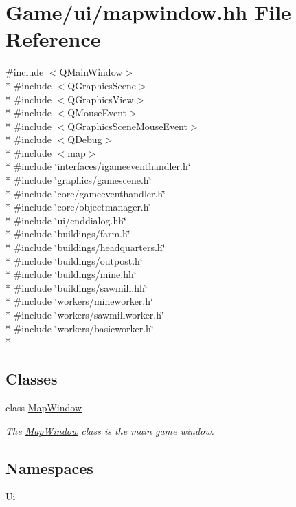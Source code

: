 \hypertarget{mapwindow_8hh}{\section{Game/ui/mapwindow.hh File Reference}
\label{mapwindow_8hh}
}
{\ttfamily \#include $<$Q\-Main\-Window$>$}\\*
{\ttfamily \#include $<$Q\-Graphics\-Scene$>$}\\*
{\ttfamily \#include $<$Q\-Graphics\-View$>$}\\*
{\ttfamily \#include $<$Q\-Mouse\-Event$>$}\\*
{\ttfamily \#include $<$Q\-Graphics\-Scene\-Mouse\-Event$>$}\\*
{\ttfamily \#include $<$Q\-Debug$>$}\\*
{\ttfamily \#include $<$map$>$}\\*
{\ttfamily \#include \char`\"{}interfaces/igameeventhandler.\-h\char`\"{}}\\*
{\ttfamily \#include \char`\"{}graphics/gamescene.\-h\char`\"{}}\\*
{\ttfamily \#include \char`\"{}core/gameeventhandler.\-h\char`\"{}}\\*
{\ttfamily \#include \char`\"{}core/objectmanager.\-h\char`\"{}}\\*
{\ttfamily \#include \char`\"{}ui/enddialog.\-hh\char`\"{}}\\*
{\ttfamily \#include \char`\"{}buildings/farm.\-h\char`\"{}}\\*
{\ttfamily \#include \char`\"{}buildings/headquarters.\-h\char`\"{}}\\*
{\ttfamily \#include \char`\"{}buildings/outpost.\-h\char`\"{}}\\*
{\ttfamily \#include \char`\"{}buildings/mine.\-hh\char`\"{}}\\*
{\ttfamily \#include \char`\"{}buildings/sawmill.\-hh\char`\"{}}\\*
{\ttfamily \#include \char`\"{}workers/mineworker.\-h\char`\"{}}\\*
{\ttfamily \#include \char`\"{}workers/sawmillworker.\-h\char`\"{}}\\*
{\ttfamily \#include \char`\"{}workers/basicworker.\-h\char`\"{}}\\*
\subsection*{Classes}
\begin{DoxyCompactItemize}
\item 
class \hyperlink{classMapWindow}{Map\-Window}
\begin{DoxyCompactList}\small\item\em The \hyperlink{classMapWindow}{Map\-Window} class is the main game window. \end{DoxyCompactList}\end{DoxyCompactItemize}
\subsection*{Namespaces}
\begin{DoxyCompactItemize}
\item 
\hyperlink{namespaceUi}{Ui}
\end{DoxyCompactItemize}
